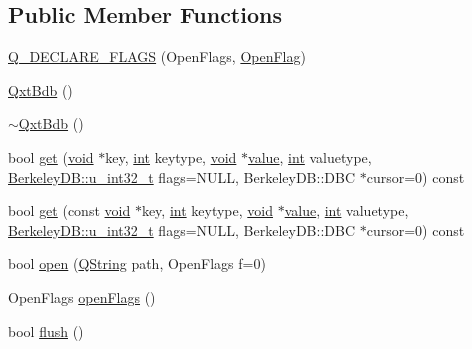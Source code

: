 \subsection*{Public Member Functions}
\begin{DoxyCompactItemize}
\item 
\hyperlink{class_qxt_bdb_a5ac25a3634147fb3028089a8c1fc94b2}{Q\-\_\-\-D\-E\-C\-L\-A\-R\-E\-\_\-\-F\-L\-A\-G\-S} (Open\-Flags, \hyperlink{class_qxt_bdb_a5ad90b31cad64fcaa2664bf456c694e0}{Open\-Flag})
\item 
\hyperlink{class_qxt_bdb_a790c662b841f3f0073ea556071bf7160}{Qxt\-Bdb} ()
\item 
\hyperlink{class_qxt_bdb_af9a017916007f97fbe601ceb5743b5b3}{$\sim$\-Qxt\-Bdb} ()
\item 
bool \hyperlink{class_qxt_bdb_aadd0a190dd205aea02f6ae55005a2914}{get} (\hyperlink{group___u_a_v_objects_plugin_ga444cf2ff3f0ecbe028adce838d373f5c}{void} $\ast$key, \hyperlink{ioapi_8h_a787fa3cf048117ba7123753c1e74fcd6}{int} keytype, \hyperlink{group___u_a_v_objects_plugin_ga444cf2ff3f0ecbe028adce838d373f5c}{void} $\ast$\hyperlink{glext_8h_aa0e2e9cea7f208d28acda0480144beb0}{value}, \hyperlink{ioapi_8h_a787fa3cf048117ba7123753c1e74fcd6}{int} valuetype, \hyperlink{namespace_berkeley_d_b_af18e51055727bcdaec71de4ebaae0d67}{Berkeley\-D\-B\-::u\-\_\-int32\-\_\-t} flags=N\-U\-L\-L, Berkeley\-D\-B\-::\-D\-B\-C $\ast$cursor=0) const 
\item 
bool \hyperlink{class_qxt_bdb_a7c61963379e0b92f8b0d00f0a46fb81c}{get} (const \hyperlink{group___u_a_v_objects_plugin_ga444cf2ff3f0ecbe028adce838d373f5c}{void} $\ast$key, \hyperlink{ioapi_8h_a787fa3cf048117ba7123753c1e74fcd6}{int} keytype, \hyperlink{group___u_a_v_objects_plugin_ga444cf2ff3f0ecbe028adce838d373f5c}{void} $\ast$\hyperlink{glext_8h_aa0e2e9cea7f208d28acda0480144beb0}{value}, \hyperlink{ioapi_8h_a787fa3cf048117ba7123753c1e74fcd6}{int} valuetype, \hyperlink{namespace_berkeley_d_b_af18e51055727bcdaec71de4ebaae0d67}{Berkeley\-D\-B\-::u\-\_\-int32\-\_\-t} flags=N\-U\-L\-L, Berkeley\-D\-B\-::\-D\-B\-C $\ast$cursor=0) const 
\item 
bool \hyperlink{class_qxt_bdb_a9049c1f74fb871f4cc804871a66cd0f5}{open} (\hyperlink{group___u_a_v_objects_plugin_gab9d252f49c333c94a72f97ce3105a32d}{Q\-String} path, Open\-Flags f=0)
\item 
Open\-Flags \hyperlink{class_qxt_bdb_a1b854c2a33e31a9a2b03610c0d8b461e}{open\-Flags} ()
\item 
bool \hyperlink{class_qxt_bdb_ab34f1dae679ea9465df93e1ec7b95c48}{flush} ()
\end{DoxyCompactItemize}
